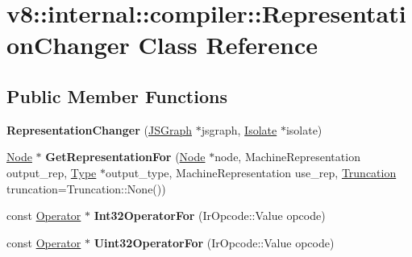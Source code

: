 \hypertarget{classv8_1_1internal_1_1compiler_1_1_representation_changer}{}\section{v8\+:\+:internal\+:\+:compiler\+:\+:Representation\+Changer Class Reference}
\label{classv8_1_1internal_1_1compiler_1_1_representation_changer}
\subsection*{Public Member Functions}
\begin{DoxyCompactItemize}
\item 
{\bfseries Representation\+Changer} (\hyperlink{classv8_1_1internal_1_1compiler_1_1_j_s_graph}{J\+S\+Graph} $\ast$jsgraph, \hyperlink{classv8_1_1internal_1_1_isolate}{Isolate} $\ast$isolate)\hypertarget{classv8_1_1internal_1_1compiler_1_1_representation_changer_ab47d442dae0649a232840eaa9b8ede97}{}\label{classv8_1_1internal_1_1compiler_1_1_representation_changer_ab47d442dae0649a232840eaa9b8ede97}

\item 
\hyperlink{classv8_1_1internal_1_1compiler_1_1_node}{Node} $\ast$ {\bfseries Get\+Representation\+For} (\hyperlink{classv8_1_1internal_1_1compiler_1_1_node}{Node} $\ast$node, Machine\+Representation output\+\_\+rep, \hyperlink{classv8_1_1internal_1_1_type}{Type} $\ast$output\+\_\+type, Machine\+Representation use\+\_\+rep, \hyperlink{classv8_1_1internal_1_1compiler_1_1_truncation}{Truncation} truncation=Truncation\+::\+None())\hypertarget{classv8_1_1internal_1_1compiler_1_1_representation_changer_ab59e3d61aa8f4aee1ae47547c3761aa8}{}\label{classv8_1_1internal_1_1compiler_1_1_representation_changer_ab59e3d61aa8f4aee1ae47547c3761aa8}

\item 
const \hyperlink{classv8_1_1internal_1_1compiler_1_1_operator}{Operator} $\ast$ {\bfseries Int32\+Operator\+For} (Ir\+Opcode\+::\+Value opcode)\hypertarget{classv8_1_1internal_1_1compiler_1_1_representation_changer_a3557bda5a7d328d82d0bc8d947bf8012}{}\label{classv8_1_1internal_1_1compiler_1_1_representation_changer_a3557bda5a7d328d82d0bc8d947bf8012}

\item 
const \hyperlink{classv8_1_1internal_1_1compiler_1_1_operator}{Operator} $\ast$ {\bfseries Uint32\+Operator\+For} (Ir\+Opcode\+::\+Value opcode)\hypertarget{classv8_1_1internal_1_1compiler_1_1_representation_changer_a3d0ab51e48ec788fbeda436c429b7489}{}\label{classv8_1_1internal_1_1compiler_1_1_representation_changer_a3d0ab51e48ec788fbeda436c429b7489}


\end{DoxyCompactItemize}
